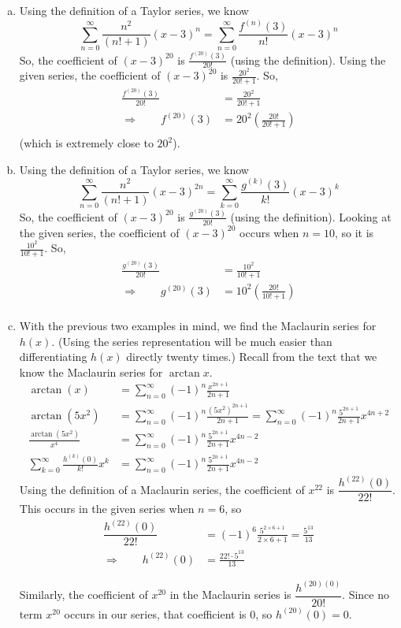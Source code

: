\begin{solution}
\begin{enumerate}[(a)]
\item
Using the definition of a Taylor series, we know
\[ \displaystyle\sum_{n=0}^\infty \frac{n^2}{(n!+1)}(x-3)^n=\displaystyle\sum_{n=0}^\infty \frac{f^{(n)}(3)}{n!}(x-3)^n\]
So, the coefficient of $(x-3)^{20}$ is  $\frac{f^{(20)}(3)}{20!}$ (using the definition). Using the given series, the coefficient of $(x-3)^{20}$ is $\frac{20^2}{20!+1}$. So,
\begin{align*}
\frac{f^{(20)}(3)}{20!}&=\frac{20^2}{20!+1}\\
\Rightarrow \qquad f^{(20)}(3)&=20^2\left(\frac{20!}{20!+1}\right)\\
\end{align*}
(which is extremely close to $20^2$).

\item
Using the definition of a Taylor series, we know
\[ \displaystyle\sum_{n=0}^\infty \frac{n^2}{(n!+1)}(x-3)^{2n}=\displaystyle\sum_{k=0}^\infty \frac{g^{(k)}(3)}{k!}(x-3)^{k}\]
So, the coefficient of $(x-3)^{20}$ is  $\frac{g^{(20)}(3)}{20!}$ (using the definition). Looking at the given series, the coefficient of $(x-3)^{20}$ occurs when $n=10$, so it is $\frac{10^2}{10!+1}$. So,
\begin{align*}
\frac{g^{(20)}(3)}{20!}&=\frac{10^2}{10!+1}\\
\Rightarrow \qquad g^{(20)}(3)&=10^2\left(\frac{20!}{10!+1}\right)\\
\end{align*}
\item
With the previous two examples in mind, we find the Maclaurin series for $h(x).$ (Using the series representation will be much easier than differentiating $h(x)$ directly twenty times.) Recall from the text that we know the Maclaurin series for $\arctan x$.
\begin{align*}
\arctan(x)&=\sum_{n=0}^\infty (-1)^n\frac{x^{2n+1}}{2n+1}\\
\arctan(5x^2)&=\sum_{n=0}^\infty (-1)^n\frac{(5x^2)^{2n+1}}{2n+1}
=\sum_{n=0}^\infty (-1)^n\frac{5^{2n+1}}{2n+1}x^{4n+2}\\
\frac{\arctan(5x^2)}{x^4}&=\sum_{n=0}^\infty (-1)^n\frac{5^{2n+1}}{2n+1}x^{4n-2}\\
\sum_{k=0}^\infty \frac{h^{(k)}(0)}{k!}x^k&=\sum_{n=0}^\infty (-1)^n\frac{5^{2n+1}}{2n+1}x^{4n-2}
\end{align*}
Using the definition of a Maclaurin series, the coefficient of $x^{22}$ is $\dfrac{h^{(22)}(0)}{22!}$. This occurs in  the given series when $n=6$, so
\begin{align*}
\dfrac{h^{(22)}(0)}{22!}&=(-1)^6\frac{5^{2\times6+1}}{2\times6+1}=\frac{5^{13}}{13}\\
\Rightarrow\qquad h^{(22)}(0)&=\frac{22!\cdot 5^{13}}{13}
\end{align*}

Similarly, the coefficient of $x^{20}$ in the Maclaurin series is $\dfrac{h^{(20)(0)}}{20!}$. Since no term $x^{20}$ occurs in our series, that coefficient is 0, so $h^{(20)}(0)=0$.
\end{enumerate}

\end{solution}

